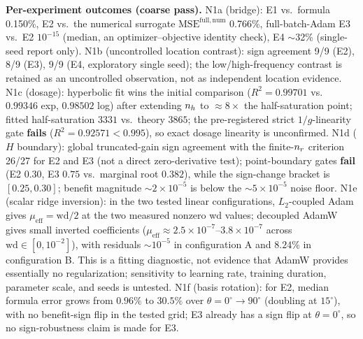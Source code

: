 \textbf{Per-experiment outcomes (coarse pass).}
N1a (bridge): E1 vs.\ formula 0.150\%, E2 vs.\ the numerical surrogate $\mathrm{MSE}^{\mathrm{full,num}}$ 0.766\%, full-batch-Adam E3 vs.\ E2 $10^{-15}$ (median, an optimizer--objective identity check), E4 $\sim$32\% (single-seed report only).
N1b (uncontrolled location contrast): sign agreement 9/9 (E2), 8/9 (E3), 9/9 (E4, exploratory single seed); the low/high-frequency contrast is retained as an uncontrolled observation, not as independent location evidence.
N1c (dosage): hyperbolic fit wins the initial comparison ($R^2=0.99701$ vs.\ $0.99346$ exp, $0.98502$ log) after extending $n_h$ to $\approx 8\times$ the half-saturation point; fitted half-saturation $3331$ vs.\ theory $3865$; the pre-registered strict $1/g$-linearity gate \textbf{fails} ($R^2=0.92571<0.995$), so exact dosage linearity is unconfirmed.
N1d ($H$ boundary): global truncated-gain sign agreement with the finite-$n_r$ criterion 26/27 for E2 and E3 (not a direct zero-derivative test); point-boundary gates \textbf{fail} (E2 $0.30$, E3 $0.75$ vs.\ marginal root $0.382$), while the sign-change bracket is $[0.25,0.30]$; benefit magnitude $\sim 2\times10^{-5}$ is below the $\sim 5\times10^{-5}$ noise floor.
N1e (scalar ridge inversion): in the two tested linear configurations, $L_2$-coupled Adam gives $\mu_{\mathrm{eff}}=\mathrm{wd}/2$ at the two measured nonzero wd values; decoupled AdamW gives small inverted coefficients ($\mu_{\mathrm{eff}}\approx2.5\times10^{-7}$--$3.8\times10^{-7}$ across $\mathrm{wd}\in[0,10^{-2}]$), with residuals $\sim10^{-5}$ in configuration A and $8.24\%$ in configuration B.
This is a fitting diagnostic, not evidence that AdamW provides essentially no regularization; sensitivity to learning rate, training duration, parameter scale, and seeds is untested.
N1f (basis rotation): for E2, median formula error grows from $0.96\%$ to $30.5\%$ over $\theta=0^\circ\to90^\circ$ (doubling at $15^\circ$), with no benefit-sign flip in the tested grid; E3 already has a sign flip at $\theta=0^\circ$, so no sign-robustness claim is made for E3.

